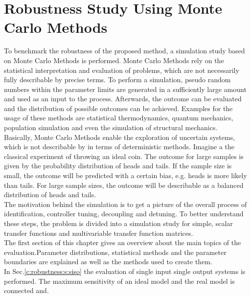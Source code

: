 \chapter{Robustness Study Using Monte Carlo Methods}
\label{c:robustness}

To benchmark the robustness of the proposed method, a simulation study based on Monte Carlo Methods is performed. Monte Carlo Methods rely on the statistical interpretation and evaluation of problems, which are not necessarily fully describable by precise terms. To perform a simulation, pseudo random numbers within the parameter limits are generated in a sufficiently large amount and used as an input to the process. Afterwards, the outcome can be evaluated and the distribution of possible outcomes can be achieved. Examples for the usage of these methods are statistical thermodynamics, quantum mechanics, population simulation and even the simulation of structural mechanics.\\

Basically, Monte Carlo Methods enable the exploration of uncertain systems, which is not describable by in terms of deterministic methods. Imagine a the classical experiment of throwing an ideal coin. The outcome for large samples is given by the probability distribution of heads and tails. If the sample size is small, the outcome will be predicted with a certain bias, e.g. heads is more likely than tails. For large sample sizes, the outcome will be describable as a balanced distribution of heads and tails.\\

The motivation behind the simulation is to get a picture of the overall process of identification, controller tuning, decoupling and detuning. To better understand these steps, the problem is divided into a simulation study for simple, scalar transfer functions and multivariable transfer function matrices.\\

The first section of this chapter gives an overview about the main topics of the evaluation.Parameter distributions, statistical methods and the parameter boundaries are explained as well as the methods used to create them.\\

In Sec.\ref{c:robustness:s:siso} the evaluation of single input single output systems is performed. The maximum sensitivity of an ideal model and the real model is connected and.

\newpage
